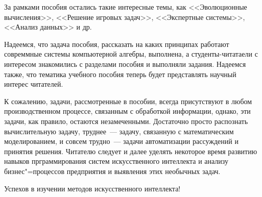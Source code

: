 \documentclass[a4paper,14pt, openany, twoside, draft]{extbook} %
\begin{document}
За рамками пособия остались такие интересные темы, как <<Эволюционные вычисления>>, <<Решение игровых задач>>, <<Экспертные системы>>, <<Анализ данных>> и др.  

Надеемся, что задача пособия, рассказать на каких принципах работают совреммные системы компьютерной алгебры, выполнена, а студенты-читатаели с интересом знакомились с разделами пособия и выполняли задания.  Надеемся также, что тематика учебного пособия теперь будет представлять научный интерес читателей. 

К сожалению, задачи, рассмотренные в пособии, всегда присутствуют в любом производственном процессе, связанным с обработкой информации, однако, эти задачи, как правило, остаются незамеченными.  Достаточно просто распознать вычислительную задачу, труднее~--- задачу, связанную с математическим моделированием, и совсем трудно~--- задачи автоматизации рассуждений и принятия решения.  Читателю следует и далее уделять некоторое время развитию навыков прграммирования систем искусственного интеллекта и анализу бизнес"=процессов предприятия и выявления этих необычных задач.

Успехов в изучении методов искусственного интеллекта!
\end{document}
